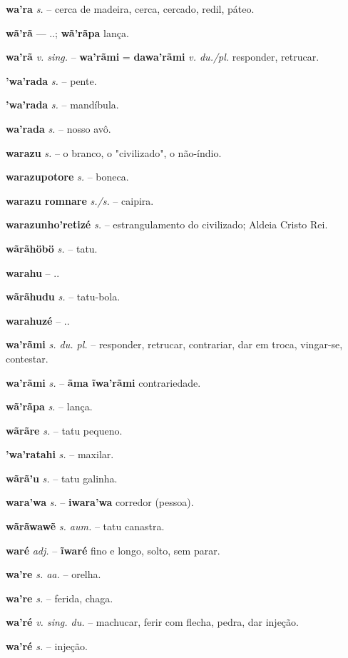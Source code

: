 \textbf{wa'ra} \textit{s.} -- cerca de madeira, cerca, cercado, redil, páteo.

\textbf{wã'rã} \textit{} --- ..; \textbf{wã'rãpa} lança.

\textbf{wa'rã} \textit{v. sing.} -- \textbf{wa'rãmi} = \textbf{dawa'rãmi} \textit{v. du./pl.} responder, retrucar.

\textbf{'wa'rada} \textit{s.} -- pente.

\textbf{'wa'rada} \textit{s.} -- mandíbula.

\textbf{wa'rada} \textit{s.} -- nosso avô.

\textbf{warazu} \textit{s.} -- o branco, o "civilizado", o não-índio.

\textbf{warazupotore} \textit{s.} -- boneca.

\textbf{warazu romnare} \textit{s./s.} -- caipira.

\textbf{warazunho'retizé} \textit{s.} -- estrangulamento do civilizado; Aldeia Cristo Rei.

\textbf{wãrãhöbö} \textit{s.} -- tatu.

\textbf{warahu} \textit{} -- ..


\textbf{wãrãhudu} \textit{s.} -- tatu-bola.

\textbf{warahuzé} \textit{} -- ..


\textbf{wa'rãmi} \textit{s. du. pl.} -- responder, retrucar, contrariar, dar em troca, vingar-se, contestar.

\textbf{wa'rãmi} \textit{s.} -- \textbf{ãma ĩwa'rãmi} contrariedade.

\textbf{wã'rãpa} \textit{s.} -- lança.

\textbf{wãrãre} \textit{s.} -- tatu pequeno.

\textbf{'wa'ratahi} \textit{s.} -- maxilar.

\textbf{wãrã'u} \textit{s.} -- tatu galinha.

\textbf{wara'wa} \textit{s.} -- \textbf{iwara'wa} corredor (pessoa).

\textbf{wãrãwawẽ} \textit{s. aum.} -- tatu canastra.

\textbf{waré} \textit{adj.} -- \textbf{ĩwaré} fino e longo, solto, sem parar.

\textbf{wa're} \textit{s. aa.} -- orelha.

\textbf{wa're} \textit{s.} -- ferida, chaga.

\textbf{wa'ré} \textit{v. sing. du.} -- machucar, ferir com flecha, pedra, dar injeção.

\textbf{wa'ré} \textit{s.} -- injeção.


